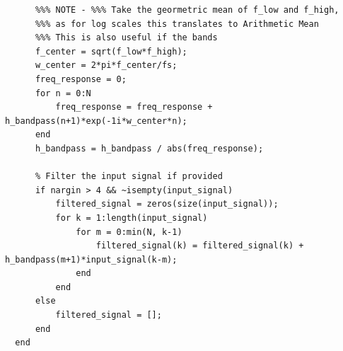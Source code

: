 \documentclass[12pt]{report}
\begin{document}
\begin{lstlisting}
      %%% NOTE - %%% Take the geormetric mean of f_low and f_high, 
      %%% as for log scales this translates to Arithmetic Mean
      %%% This is also useful if the bands 
      f_center = sqrt(f_low*f_high); 
      w_center = 2*pi*f_center/fs;
      freq_response = 0;
      for n = 0:N
          freq_response = freq_response + h_bandpass(n+1)*exp(-1i*w_center*n);
      end
      h_bandpass = h_bandpass / abs(freq_response);
      
      % Filter the input signal if provided
      if nargin > 4 && ~isempty(input_signal)
          filtered_signal = zeros(size(input_signal));
          for k = 1:length(input_signal)
              for m = 0:min(N, k-1)
                  filtered_signal(k) = filtered_signal(k) + h_bandpass(m+1)*input_signal(k-m);
              end
          end
      else
          filtered_signal = [];
      end
  end
  \end{lstlisting}
\end{document}

